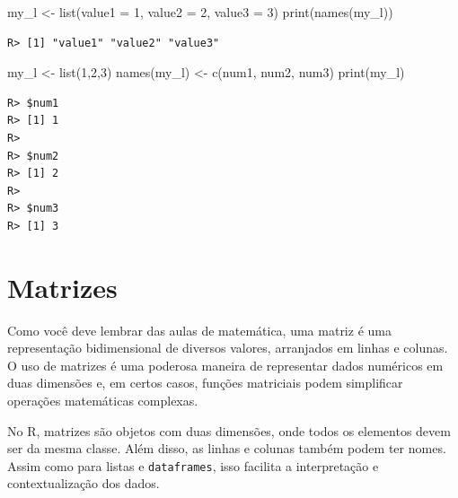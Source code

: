 \documentclass[
  11pt,
]{book}
\newenvironment{Shaded}{\begin{snugshade}}{\end{snugshade}}
\newcommand{\AttributeTok}[1]{\textcolor[rgb]{0.61,0.61,0.61}{#1}}
\newcommand{\DecValTok}[1]{\textcolor[rgb]{0.06,0.06,0.06}{#1}}
\newcommand{\FunctionTok}[1]{\textcolor[rgb]{0,0,0}{#1}}
\newcommand{\NormalTok}[1]{#1}
\newcommand{\OtherTok}[1]{\textcolor[rgb]{0.37,0.37,0.37}{#1}}
\newcommand{\StringTok}[1]{\textcolor[rgb]{0.5,0.5,0.5}{#1}}
\begin{document}
\begin{Shaded}
\begin{Highlighting}[]
\NormalTok{my\_l }\OtherTok{\textless{}{-}} \FunctionTok{list}\NormalTok{(}\AttributeTok{value1 =} \DecValTok{1}\NormalTok{, }\AttributeTok{value2 =} \DecValTok{2}\NormalTok{, }\AttributeTok{value3 =} \DecValTok{3}\NormalTok{)}
\FunctionTok{print}\NormalTok{(}\FunctionTok{names}\NormalTok{(my\_l))}
\end{Highlighting}
\end{Shaded}

\begin{verbatim}
R> [1] "value1" "value2" "value3"
\end{verbatim}

\begin{Shaded}
\begin{Highlighting}[]
\NormalTok{my\_l }\OtherTok{\textless{}{-}} \FunctionTok{list}\NormalTok{(}\DecValTok{1}\NormalTok{,}\DecValTok{2}\NormalTok{,}\DecValTok{3}\NormalTok{)}
\FunctionTok{names}\NormalTok{(my\_l) }\OtherTok{\textless{}{-}} \FunctionTok{c}\NormalTok{(}\StringTok{\textquotesingle{}num1\textquotesingle{}}\NormalTok{, }\StringTok{\textquotesingle{}num2\textquotesingle{}}\NormalTok{, }\StringTok{\textquotesingle{}num3\textquotesingle{}}\NormalTok{)}
\FunctionTok{print}\NormalTok{(my\_l)}
\end{Highlighting}
\end{Shaded}

\begin{verbatim}
R> $num1
R> [1] 1
R> 
R> $num2
R> [1] 2
R> 
R> $num3
R> [1] 3
\end{verbatim}

\hypertarget{matrizes}{%
\section{Matrizes}\label{matrizes}}

Como você deve lembrar das aulas de matemática, uma matriz é uma representação bidimensional de diversos valores, arranjados em linhas e colunas. O uso de matrizes é uma poderosa maneira de representar dados numéricos em duas dimensões e, em certos casos, funções matriciais podem simplificar operações matemáticas complexas.

No R, matrizes são objetos com duas dimensões, onde todos os elementos devem ser da mesma classe. Além disso, as linhas e colunas também podem ter nomes. Assim como para listas e \texttt{dataframes}, isso facilita a interpretação e contextualização dos dados.
\end{document}
